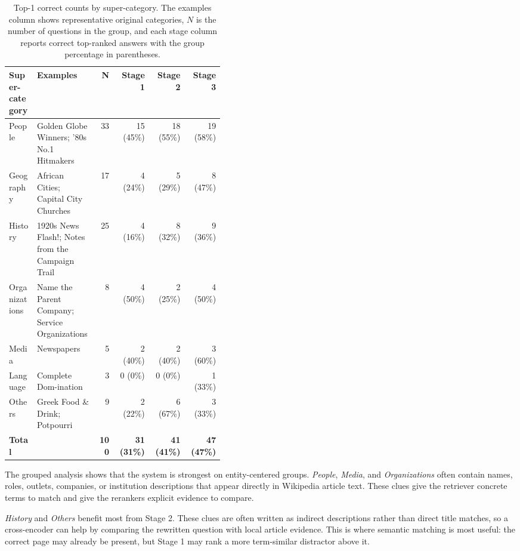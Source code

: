 \documentclass[11pt]{article}
\begin{document}
\begin{table}[t]
  \centering
  \scriptsize
  \caption{Top-1 correct counts by super-category. The examples column shows representative original categories, $N$ is the number of questions in the group, and each stage column reports correct top-ranked answers with the group percentage in parentheses.}
  \label{tab:grouped-categories}
  \begin{tabular}{p{0.13\linewidth}p{0.29\linewidth}rrrr}
    \toprule
    \textbf{Super-category} & \textbf{Examples} & \textbf{N} & \textbf{Stage 1} & \textbf{Stage 2} & \textbf{Stage 3} \\
    \midrule
    People & Golden Globe Winners; '80s No.1 Hitmakers & 33 & 15 (45\%) & 18 (55\%) & 19 (58\%) \\
    Geography & African Cities; Capital City Churches & 17 & 4 (24\%) & 5 (29\%) & 8 (47\%) \\
    History & 1920s News Flash!; Notes from the Campaign Trail & 25 & 4 (16\%) & 8 (32\%) & 9 (36\%) \\
    Organizations & Name the Parent Company; Service Organizations & 8 & 4 (50\%) & 2 (25\%) & 4 (50\%) \\
    Media & Newspapers & 5 & 2 (40\%) & 2 (40\%) & 3 (60\%) \\
    Language & Complete Dom-ination & 3 & 0 (0\%) & 0 (0\%) & 1 (33\%) \\
    Others & Greek Food \& Drink; Potpourri & 9 & 2 (22\%) & 6 (67\%) & 3 (33\%) \\
    \midrule
    \textbf{Total} & & \textbf{100} & \textbf{31 (31\%)} & \textbf{41 (41\%)} & \textbf{47 (47\%)} \\
    \bottomrule
  \end{tabular}
\end{table}

The grouped analysis shows that the system is strongest on entity-centered groups. \textit{People}, \textit{Media}, and \textit{Organizations} often contain names, roles, outlets, companies, or institution descriptions that appear directly in Wikipedia article text. These clues give the retriever concrete terms to match and give the rerankers explicit evidence to compare.

\textit{History} and \textit{Others} benefit most from Stage 2. These clues are often written as indirect descriptions rather than direct title matches, so a cross-encoder can help by comparing the rewritten question with local article evidence. This is where semantic matching is most useful: the correct page may already be present, but Stage 1 may rank a more term-similar distractor above it.
\end{document}

